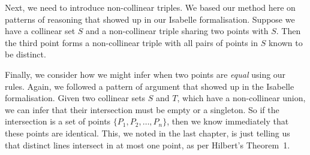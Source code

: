 Next, we need to introduce non-collinear triples. We based our method here on patterns of reasoning that showed up in our Isabelle formalisation. Suppose we have a collinear set $S$ and a non-collinear triple sharing two points with $S$. Then the third point forms a non-collinear triple with all pairs of points in $S$ known to be distinct.

Finally, we consider how we might infer when two points are \emph{equal} using our rules. Again, we followed a pattern of argument that showed up in the Isabelle formalisation. Given two collinear sets $S$ and $T$, which have a non-collinear union, we can infer that their intersection must be empty or a singleton. So if the intersection is a set of points $\{P_1,P_2,\ldots,P_n\}$, then we know immediately that these points are identical. This, we noted in the last chapter, is just telling us that distinct lines intersect in at most one point, as per Hilbert's Theorem~1.

